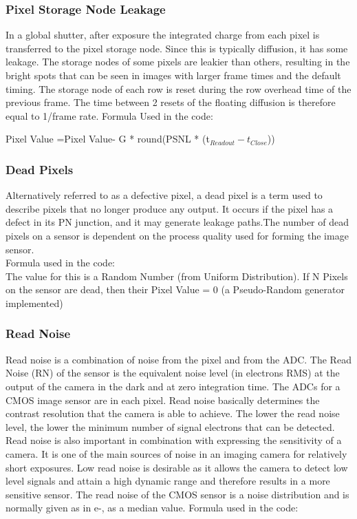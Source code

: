 \documentclass[../../main.tex]{subfiles}
\begin{document}
\subsubsection{Pixel Storage Node Leakage} %
In a global shutter, after exposure the integrated charge from each pixel is transferred to the pixel storage node. Since this is typically diffusion, it has some leakage. The storage nodes of some pixels are leakier than others, resulting in the bright spots that can be seen in images with larger frame times and the default timing.
The storage node of each row is reset during the row overhead time of the previous frame. The time between 2 resets of the floating diffusion is therefore equal to 1/frame rate.
Formula Used in the code:

 Pixel Value =Pixel Value- G * round(PSNL * (t$_{Readout} - t_{Close}$))



\subsubsection{Dead Pixels} %
Alternatively referred to as a defective pixel, a dead pixel is a term used to describe pixels that no longer produce any output. It occurs if the pixel has a defect in its PN junction, and it may generate leakage paths.The number of dead pixels on a sensor is dependent on the process quality used for forming the image sensor.
\\Formula used in the code:
\\The value for this is a Random Number (from Uniform Distribution). If N Pixels on the sensor are dead, then their Pixel Value = 0 (a Pseudo-Random generator implemented)


\subsubsection{Read Noise} %
Read noise is a combination of noise from the pixel and from the ADC. The Read Noise (RN) of the sensor is the equivalent noise level (in electrons RMS) at the output of the camera in the dark and at zero integration time. The ADCs for a CMOS image sensor are in each pixel.
Read noise basically determines the contrast resolution that the camera is able to achieve. The lower the read noise level, the lower the minimum number of signal electrons that can be detected. Read noise is also important in combination with expressing the sensitivity of a camera. 
It is one of the main sources of noise in an imaging camera for relatively short exposures. Low read noise is desirable as it allows the camera to detect low level signals and attain a high dynamic range and therefore results in a more sensitive sensor.
The read noise of the CMOS sensor is a noise distribution and is normally given as in e-, as a median value.
Formula used in the code:
\end{document}
